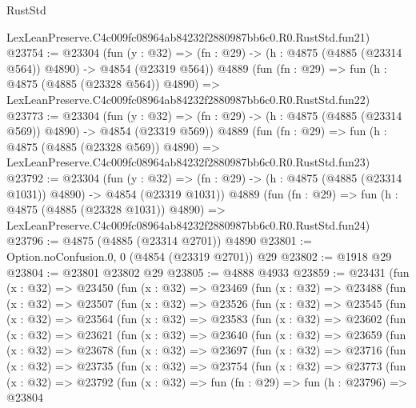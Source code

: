 \begin{lexlean}{RustStd}
\begin{coremodule}
    LexLeanPreserve.C4c009fc08964ab84232f2880987bb6c0.R0.RustStd.fun21)
@23754 := @23304
    (fun (y : @32) => (fn : @29) -> (h : @4875 (@4885 (@23314 @564)) @4890) -> @4854 (@23319 @564))
    @4889
    (fun (fn : @29) =>
    fun (h : @4875 (@4885 (@23328 @564)) @4890) =>
    LexLeanPreserve.C4c009fc08964ab84232f2880987bb6c0.R0.RustStd.fun22)
@23773 := @23304
    (fun (y : @32) => (fn : @29) -> (h : @4875 (@4885 (@23314 @569)) @4890) -> @4854 (@23319 @569))
    @4889
    (fun (fn : @29) =>
    fun (h : @4875 (@4885 (@23328 @569)) @4890) =>
    LexLeanPreserve.C4c009fc08964ab84232f2880987bb6c0.R0.RustStd.fun23)
@23792 := @23304
    (fun (y : @32) =>
    (fn : @29) -> (h : @4875 (@4885 (@23314 @1031)) @4890) -> @4854 (@23319 @1031))
    @4889
    (fun (fn : @29) =>
    fun (h : @4875 (@4885 (@23328 @1031)) @4890) =>
    LexLeanPreserve.C4c009fc08964ab84232f2880987bb6c0.R0.RustStd.fun24)
@23796 := @4875 (@4885 (@23314 @2701)) @4890
@23801 := Option.noConfusion.{0, 0} (@4854 (@23319 @2701)) @29
@23802 := @1918 @29
@23804 := @23801 @23802 @29
@23805 := @4888 @4933
@23859 := @23431
    (fun (x : @32) =>
    @23450
      (fun (x : @32) =>
      @23469
        (fun (x : @32) =>
        @23488
          (fun (x : @32) =>
          @23507
            (fun (x : @32) =>
            @23526
              (fun (x : @32) =>
              @23545
                (fun (x : @32) =>
                @23564
                  (fun (x : @32) =>
                  @23583
                    (fun (x : @32) =>
                    @23602
                      (fun (x : @32) =>
                      @23621
                        (fun (x : @32) =>
                        @23640
                          (fun (x : @32) =>
                          @23659
                            (fun (x : @32) =>
                            @23678
                              (fun (x : @32) =>
                              @23697
                                (fun (x : @32) =>
                                @23716
                                  (fun (x : @32) =>
                                  @23735
                                    (fun (x : @32) =>
                                    @23754
                                      (fun (x : @32) =>
                                      @23773
                                        (fun (x : @32) =>
                                        @23792
                                          (fun (x : @32) =>
                                          fun (fn : @29) =>
                                          fun (h : @23796) =>
                                          @23804

\end{coremodule}
\end{lexlean}
